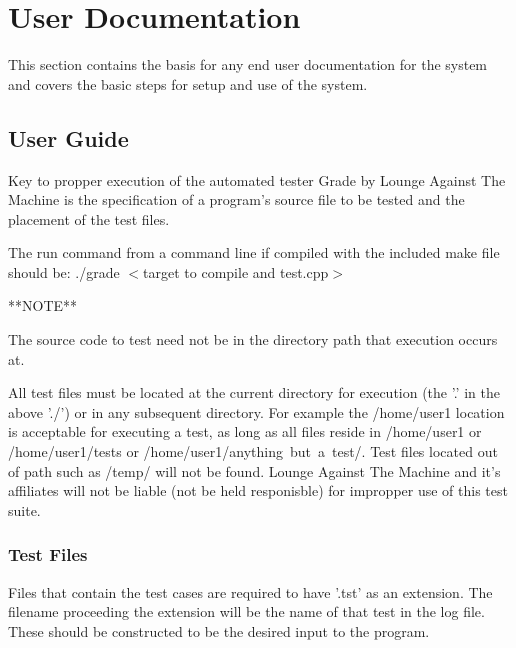 
\chapter{User Documentation}

This section contains the basis for any end user documentation for the system and covers the basic steps for setup and use of the system. 

\section{User Guide}

Key to propper execution of the automated tester Grade by Lounge Against The Machine is the specification of a program's source file to be tested and the placement of the test files.

The run command from a command line if compiled with the included make file should be: ./grade $<$target to compile and test.cpp$>$\newline\newline

**NOTE**\newline

The source code to test need not be in the directory path that execution occurs at.\newline\newline

All test files must be located at the current directory for execution (the '.' in the above './') or in any subsequent directory.  For example the /home/user1 location is acceptable for executing a test, as long as all files reside in /home/user1 or /home/user1/tests or /home/user1/anything\ but\ a\ test/.  Test files located out of path such as /temp/ will not be found.  \newline\newline
Lounge Against The Machine and it's affiliates will not be liable (not be held responisble) for impropper use of this test suite.

\subsection{Test Files}
Files that contain the test cases are required to have '.tst' as an extension. The filename proceeding the extension will be the name of that test in the log file. These should be constructed to be the desired input to the program.

